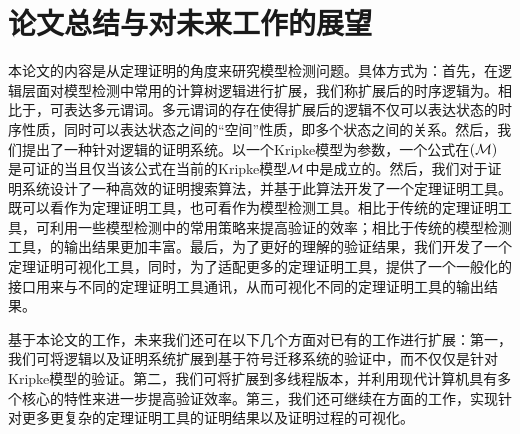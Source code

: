\chapter{论文总结与对未来工作的展望}\label{chapt:conclusion}
本论文的内容是从定理证明的角度来研究模型检测问题。具体方式为：首先，在逻辑层面对模型检测中常用的计算树逻辑\CTL{}进行扩展，我们称扩展后的时序逻辑为\CTLP{}。相比于\CTL{}，\CTLP{}可表达多元谓词。多元谓词的存在使得扩展后的逻辑不仅可以表达状态的时序性质，同时可以表达状态之间的“空间”性质，即多个状态之间的关系。然后，我们提出了一种针对\CTLP{}逻辑的证明系统\SCTL{}。\SCTL{}以一个Kripke模型为参数，一个\CTLP{}公式在\SCTL$(\cal M)$是可证的当且仅当该公式在当前的Kripke模型$\cal M$中是成立的。然后，我们对于\SCTL{}证明系统设计了一种高效的证明搜索算法，并基于此算法开发了一个定理证明工具\sctlprov{}。\sctlprov{}既可以看作为定理证明工具，也可看作为模型检测工具。相比于传统的定理证明工具，\sctlprov{}可利用一些模型检测中的常用策略来提高验证的效率；相比于传统的模型检测工具，\sctlprov{}的输出结果更加丰富。最后，为了更好的理解\sctlprov{}的验证结果，我们开发了一个定理证明可视化工具，同时，为了适配更多的定理证明工具，提供了一个一般化的接口用来与不同的定理证明工具通讯，从而可视化不同的定理证明工具的输出结果。

基于本论文的工作，未来我们还可在以下几个方面对已有的工作进行扩展：第一，我们可将\CTLP{}逻辑以及\SCTL{}证明系统扩展到基于符号迁移系统的验证中，而不仅仅是针对Kripke模型的验证。第二，我们可将\sctlprov{}扩展到多线程版本，并利用现代计算机具有多个核心的特性来进一步提高验证效率。第三，我们还可继续在方面的工作，实现针对更多更复杂的定理证明工具的证明结果以及证明过程的可视化。